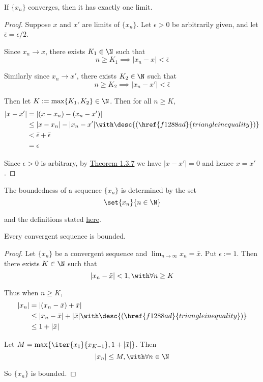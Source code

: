 \label{e6b43e0}

If $\{x_n\}$ converges, then it has exactly one limit.

\begin{proof}
  Suppose $x$ and $x'$ are limits of $\{x_n\}$. Let $\epsilon>0$ be
  arbitrarily given, and let $\bar\epsilon=\epsilon/2$.

  Since $x_n\to x$, there exists $K_1\in\N$ such that
  $$
    n\geq K_1\implies |x_n-x|<\bar\epsilon
  $$

  Similarly since $x_n\to x'$, there exists $K_2\in\N$ such that
  $$
    n\geq K_2\implies |x_n-x'|<\bar\epsilon
  $$

  Then let $K:=\max\{K_1,K_2\}\in\N$. Then for all $n\geq K$,
  \begin{align*}
    |x-x'| &= |(x-x_n)-(x_n-x')|                                                  \\
           &\leq|x-x_n|-|x_n-x'|\with\desc{(\href{f1288ad}{triangle inequality})} \\
           &<\bar\epsilon+\bar\epsilon                                            \\
           &=\epsilon
  \end{align*}

  Since $\epsilon>0$ is arbitrary, by \href{1.3.7}{Theorem 1.3.7} we have
  $|x-x'|=0$ and hence $x=x'$.
\end{proof}

\label{d5ed299}

The boundedness of a sequence $\{x_n\}$ is determined by the set
$$
  \set{x_n}{n\in\N}
$$

and the definitions stated \href{e4698be}{here}.

\label{d8148e6}

Every convergent sequence is bounded.

\begin{proof}
  Let $\{x_n\}$ be a convergent sequence and $\lim_{n\to\infty}x_n=\bar x$. Put
  $\epsilon:=1$. Then there exists $K\in\N$ such that
  $$
    |x_n-\bar x|<1,\with\forall n\geq K
  $$

  Thus when $n\geq K$,
  \begin{align*}
    |x_n| &= |(x_n-\bar x)+\bar x|                                                    \\
          &\leq|x_n-\bar x|+|\bar x|\with\desc{(\href{f1288ad}{triangle inequality})} \\
          &\leq1+|\bar x|
  \end{align*}

  Let $M=\max\{\iter{x_1}{x_{K-1}},1+|\bar x|\}$. Then
  $$
    |x_n|\leq M,\with\forall n\in\N
  $$

  So $\{x_n\}$ is bounded.
\end{proof}

